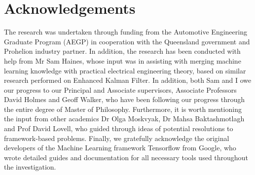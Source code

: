 \section{Acknowledgements} \label{sec:acknowledgements}
The research was undertaken through funding from the Automotive Engineering Graduate Program (AEGP) in cooperation with the Queensland government and Prohelion industry partner.
In addition, the research has been conducted with help from Mr Sam Haines, whose input was in assisting with merging machine learning knowledge with practical electrical engineering theory, based on similar research performed on Enhanced Kalman Filter.
In addition, both Sam and I owe our progress to our Principal and Associate supervisors, Associate Professors David Holmes and Geoff Walker, who have been following our progress through the entire degree of Master of Philosophy.
Furthermore, it is worth mentioning the input from other academics Dr Olga Moskvyak, Dr Mahsa Baktashmotlagh and Prof David Lovell, who guided through ideas of potential resolutions to framework-based problems.
Finally, we gratefully acknowledge the original developers of the Machine Learning framework Tensorflow from Google, who wrote detailed guides and documentation for all necessary tools used throughout the investigation.
